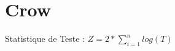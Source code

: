 \documentclass[a4paper,12pt]{article}
\begin{document}
\section{Crow}

Statistique de Teste : $ Z = 2*\sum_{i=1}^{n} log(T)$
\end{document}
